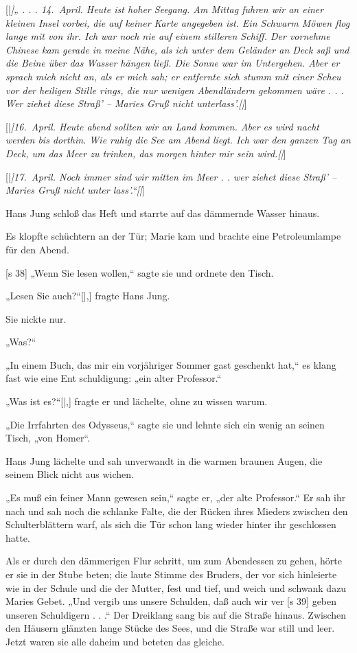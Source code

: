 [|\textit{]„ . . . 14.\ April. Heute ist hoher Seegang.
Am Mittag fuhren wir an einer kleinen Insel vorbei,
die auf keiner Karte angegeben ist. Ein Schwarm
Möwen flog lange mit von ihr. Ich war noch nie
auf einem stilleren Schiff. Der vornehme Chinese
kam gerade in meine Nähe, als ich unter dem Geländer
an Deck saß und die Beine über das Wasser hängen
ließ. Die Sonne war im Untergehen. Aber er sprach
mich nicht an, als er mich sah; er entfernte sich stumm
mit einer Scheu vor der heiligen Stille rings, die nur
wenigen Abendländern gekommen wäre . . . Wer
ziehet diese Straß' – Maries Gruß nicht unterlass'.[|}]

[|\textit{]16.\ April. Heute abend sollten wir an Land
kommen. Aber es wird nacht werden bis dorthin.
Wie ruhig die See am Abend liegt. Ich war den
ganzen Tag an Deck, um das Meer zu trinken, das
morgen hinter mir sein wird.[|}]

[|\textit{]17.\ April. Noch immer sind wir mitten im Meer . .
wer ziehet diese Straß' – Maries Gruß nicht unter­
lass'.“[|}]

Hans Jung schloß das Heft und starrte auf das
dämmernde Wasser hinaus.

Es klopfte schüchtern an der Tür; Marie kam
und brachte eine Petroleumlampe für den Abend.

[s 38]
„Wenn Sie lesen wollen,“ sagte sie und ordnete
den Tisch.

„Lesen Sie auch?“[|,] fragte Hans Jung.

Sie nickte nur.

„Was?“

„In einem Buch, das mir ein vorjähriger Sommer­
gast geschenkt hat,“ es klang fast wie eine Ent­
schuldigung: „ein alter Professor.“

„Was ist es?“[|,] fragte er und lächelte, ohne zu
wissen warum.

„Die Irrfahrten des Odysseus,“ sagte sie und
lehnte sich ein wenig an seinen Tisch, „von Homer“.

Hans Jung lächelte und sah unverwandt in die
warmen braunen Augen, die seinem Blick nicht aus­
wichen.

„Es muß ein feiner Mann gewesen sein,“ sagte
er, „der alte Professor.“ Er sah ihr nach und sah
noch die schlanke Falte, die der Rücken ihres Mieders
zwischen den Schulterblättern warf, als sich die Tür
schon lang wieder hinter ihr geschlossen hatte.

Als er durch den dämmerigen Flur schritt, um
zum Abendessen zu gehen, hörte er sie in der Stube
beten; die laute Stimme des Bruders, der vor sich
hinleierte wie in der Schule und die der Mutter, fest
und tief, und weich und schwank dazu Maries Gebet.
„Und vergib uns unsere Schulden, daß auch wir ver­
[s 39]
geben unseren Schuldigern . . .“ Der Dreiklang sang
bis auf die Straße hinaus. Zwischen den Häusern
glänzten lange Stücke des Sees, und die Straße war
still und leer. Jetzt waren sie alle daheim und beteten
das gleiche.

